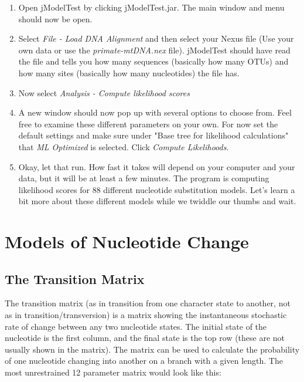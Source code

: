 \documentclass[11pt]{article}
\begin{document}
\begin{enumerate}

\item Open jModelTest by clicking jModelTest.jar. The main window and menu should now be open.

\item Select \textit{File - Load DNA Alignment} and then select your Nexus file (Use your own data or use the \textit{primate-mtDNA.nex} file).  jModelTest should have read the file and tells you how many sequences (basically how many OTUs) and how many sites (basically how many nucleotides) the file has.

\item Now select \textit{Analysis - Compute likelihood scores}

\item A new window should now pop up with several options to choose from.  Feel free to examine these different parameters on your own.  For now set the default settings and make sure under "Base tree for likelihood calculations" that \textit{ML Optimized} is selected. Click \textit{Compute Likelihoods}.

\item Okay, let that run.  How fast it takes will depend on your computer and your data, but it will be at least a few minutes.  The program is computing likelihood scores for 88 different nucleotide substitution models.  Let's learn a bit more about these different models while we twiddle our thumbs and wait.

\end{enumerate}


\section{Models of Nucleotide Change}

\subsection{The Transition Matrix}

The transition matrix (as in transition from one character state to another, not as in transition/transversion) 
is a matrix showing the instantaneous stochastic rate of change between any two nucleotide states. 
The initial state of the nucleotide is the first column, and the final state is the top row 
(these are not usually shown in the matrix).
The matrix can be used to calculate the probability of one nucleotide changing into another on a branch with a given length.  
The most unrestrained 12 parameter matrix would look like this:
\end{document}
